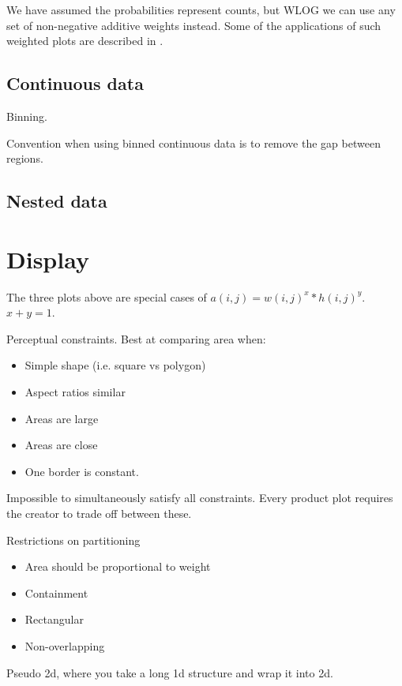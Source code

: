 \documentclass[letterpaper,oneside]{scrartcl}
\begin{document}
We have assumed the probabilities represent counts, but WLOG we can use any set of non-negative additive weights instead.  Some of the applications of such weighted plots are described in \citet{unwin:2007}.

\subsection{Continuous data}
\label{sub:continuous_data}

Binning. 

Convention when using binned continuous data is to remove the gap between regions.

\subsection{Nested data}
\label{sub:nested_data}

\section{Display}
\label{sec:display}


The three plots above are special cases of $a(i, j) = w(i, j)^x * h(i, j)^y$.  $x + y = 1$.

Perceptual constraints.  Best at comparing area when:

\begin{itemize}
  \item Simple shape (i.e. square vs polygon)
  \item Aspect ratios similar
  \item Areas are large
  \item Areas are close
  \item One border is constant.
\end{itemize}

Impossible to simultaneously satisfy all constraints.  Every product plot requires the creator to trade off between these.

Restrictions on partitioning

\begin{itemize}
  \item Area should be proportional to weight
  \item Containment
  \item Rectangular
  \item Non-overlapping
\end{itemize}

Pseudo 2d, where you take a long 1d structure and wrap it into 2d.
\end{document}
